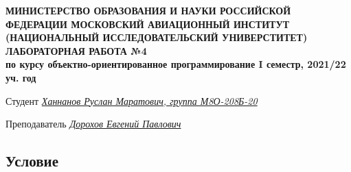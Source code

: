 \documentclass[12pt]{article}
\begin{document}
\begin{titlepage}
\begin{center}
\textbf{МИНИСТЕРСТВО ОБРАЗОВАНИЯ И НАУКИ РОССИЙСКОЙ ФЕДЕРАЦИИ
\medskip
МОСКОВСКИЙ АВИАЦИОННЫЙ ИНСТИТУТ
(НАЦИОНАЛЬНЫЙ ИССЛЕДОВАТЕЛЬСКИЙ УНИВЕРСТИТЕТ)
\vfill\vfill
{\Huge ЛАБОРАТОРНАЯ РАБОТА №4} \\
по курсу объектно-ориентированное программирование
I семестр, 2021/22 уч. год}
\end{center}
\vfill

Студент \uline{\it {Ханнанов Руслан Маратович, группа М8О-208Б-20}\hfill}

Преподаватель \uline{\it {Дорохов Евгений Павлович}\hfill}

\vfill
\end{titlepage}

\subsection*{Условие}
\end{document}
